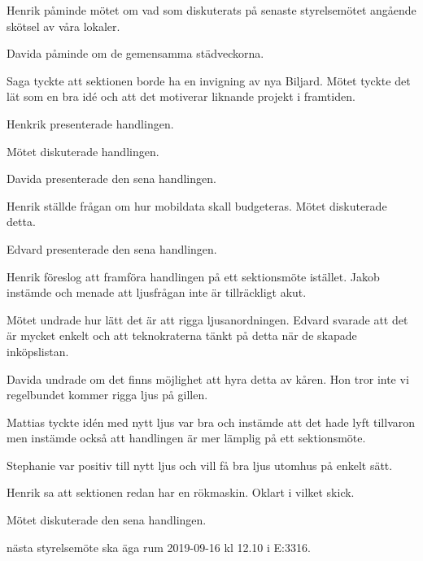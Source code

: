 \documentclass[10pt]{article}
\begin{document}
\begin{paragrafer}
Henrik påminde mötet om vad som diskuterats på senaste styrelsemötet angående skötsel av våra lokaler. 

Davida påminde om de gemensamma städveckorna. 

Saga tyckte att sektionen borde ha en invigning av nya Biljard. Mötet tyckte det lät som en bra idé och att det motiverar liknande projekt i framtiden. 

Henkrik presenterade handlingen.

Mötet diskuterade handlingen.

\Mbabay

Davida presenterade den sena handlingen.

Henrik ställde frågan om hur mobildata skall budgeteras. Mötet diskuterade detta.  

\Mbabay


Edvard presenterade den sena handlingen.

Henrik föreslog att framföra handlingen på ett sektionsmöte istället. Jakob instämde och menade att ljusfrågan inte är tillräckligt akut. 

Mötet undrade hur lätt det är att rigga ljusanordningen. Edvard svarade att det är mycket enkelt och att teknokraterna tänkt på detta när de skapade inköpslistan. 

Davida undrade om det finns möjlighet att hyra detta av kåren. Hon tror inte vi regelbundet kommer rigga ljus på gillen.

Mattias tyckte idén med nytt ljus var bra och instämde att det hade lyft tillvaron men instämde också att handlingen är mer lämplig på ett sektionsmöte. 

Stephanie var positiv till nytt ljus och vill få bra ljus utomhus på enkelt sätt.

Henrik sa att sektionen redan har en rökmaskin. Oklart i vilket skick.  

Mötet diskuterade den sena handlingen. 

\Mbaay

\Mba nästa styrelsemöte ska äga rum 2019-09-16 kl 12.10 i E:3316.



\end{paragrafer}
\end{document}
